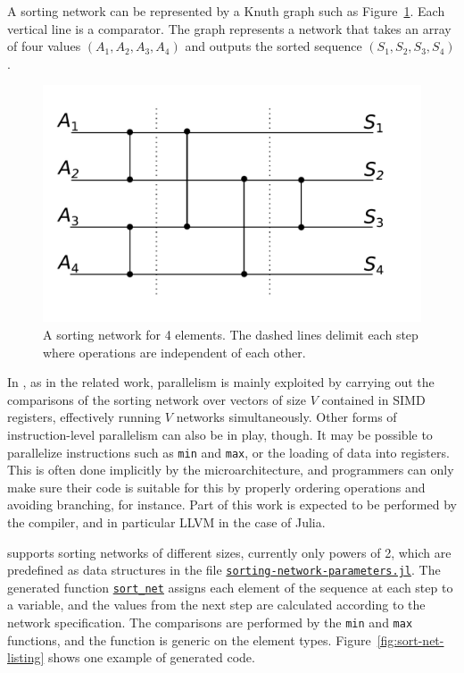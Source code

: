 \documentclass{juliacon}
\begin{document}
A sorting network can be represented by a Knuth graph such as Figure~\ref{fig:sorting-network}. Each vertical line is a comparator. The graph represents a network that takes an array of four values $(A_1, A_2, A_3, A_4)$ and outputs the sorted sequence $(S_1, S_2, S_3, S_4)$.
\begin{figure}[htb]
\centerline{\includegraphics[width=0.6\linewidth]{fig/sorting-network-4.pdf}}
\caption{A sorting network for 4 elements. The dashed lines delimit each step where operations are independent of each other.}
\label{fig:sorting-network}
\end{figure}

In \chipsort, as in the related work, parallelism is mainly exploited by carrying out the comparisons of the sorting network over vectors of size $V$ contained in SIMD registers, effectively running $V$ networks simultaneously. Other forms of instruction-level parallelism can also be in play, though. It may be possible to parallelize instructions such as {\tt min} and {\tt max}, or the loading of data into registers. This is often done implicitly by the microarchitecture, and programmers can only make sure their code is suitable for this by properly ordering operations and avoiding branching, for instance. Part of this work is expected to be performed by the compiler, and in particular LLVM in the case of Julia.

\chipsort supports sorting networks of different sizes, currently only powers of 2, which are predefined as data structures in the file \href{https://github.com/nlw0/chipsort.jl/blob/d2d049b7413f0073476021fa62fb748803130768/src/sorting-network-parameters.jl}{\tt sorting-network-parameters.jl}. The generated function \href{https://github.com/nlw0/chipsort.jl/blob/d2d049b7413f0073476021fa62fb748803130768/src/sorting-networks.jl#L13}{\tt sort\_net} assigns each element of the sequence at each step to a variable, and the values from the next step are calculated according to the network specification. The comparisons are performed by the {\tt min} and {\tt max} functions, and the function is generic on the element types. Figure~\ref{fig:sort-net-listing} shows one example of generated code.
\end{document}

